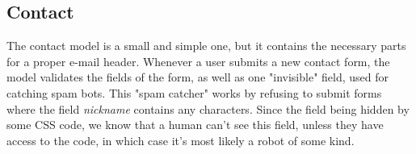 \subsection{Contact}
The contact model is a small and simple one, but it contains the necessary parts for a proper e-mail header. 
Whenever a user submits a new contact form, the model validates the fields of the form, as well as one "invisible" field, 
used for catching spam bots. This "spam catcher" works by refusing to submit forms where the field \textit{nickname} 
contains any characters. Since the field being hidden by some CSS code, we know that a human can't see this field, unless they have access to the code, in which case it's most likely a robot of some kind.
 

